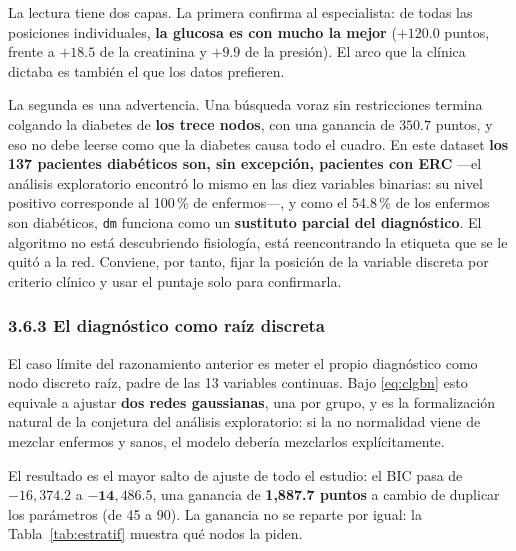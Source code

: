 \documentclass[11pt, a4paper]{article}
\begin{document}
La lectura tiene dos capas. La primera confirma al especialista: de todas las posiciones
individuales, \textbf{la glucosa es con mucho la mejor} ($+120.0$ puntos, frente a $+18.5$ de la
creatinina y $+9.9$ de la presión). El arco que la clínica dictaba es también el que los datos
prefieren.

La segunda es una advertencia. Una búsqueda voraz sin restricciones termina colgando la diabetes
de \textbf{los trece nodos}, con una ganancia de $350.7$ puntos, y eso no debe leerse como que la
diabetes causa todo el cuadro. En este dataset \textbf{los 137 pacientes diabéticos son, sin
excepción, pacientes con ERC} —el análisis exploratorio encontró lo mismo en las diez variables
binarias: su nivel positivo corresponde al 100\,\% de enfermos—, y como el 54.8\,\% de los enfermos
son diabéticos, \texttt{dm} funciona como un \textbf{sustituto parcial del diagnóstico}. El
algoritmo no está descubriendo fisiología, está reencontrando la etiqueta que se le quitó a la
red. Conviene, por tanto, fijar la posición de la variable discreta por criterio clínico y usar el
puntaje solo para confirmarla.

\subsubsection*{3.6.3 El diagnóstico como raíz discreta}

El caso límite del razonamiento anterior es meter el propio diagnóstico como nodo discreto raíz,
padre de las 13 variables continuas. Bajo \eqref{eq:clgbn} esto equivale a ajustar
\textbf{dos redes gaussianas}, una por grupo, y es la formalización natural de la conjetura del
análisis exploratorio: si la no normalidad viene de mezclar enfermos y sanos, el modelo debería
mezclarlos explícitamente.

El resultado es el mayor salto de ajuste de todo el estudio: el BIC pasa de $-16{,}374.2$ a
$\mathbf{-14{,}486.5}$, una ganancia de \textbf{1{,}887.7 puntos} a cambio de duplicar los
parámetros (de 45 a 90). La ganancia no se reparte por igual: la Tabla~\ref{tab:estratif} muestra
qué nodos la piden.
\end{document}
